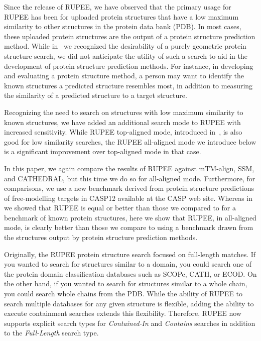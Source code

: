 \documentclass[10pt,letterpaper]{article}
\begin{document}
Since the release of RUPEE, we have observed that the primary usage for RUPEE has been for uploaded protein structures that have a low maximum similarity to other structures in the protein data bank (PDB).
In most cases, these uploaded protein structures are the output of a protein structure prediction method. 
While in~\cite{Ayoub2019} we recognized the desirability of a purely geometric protein structure search, we did not anticipate the utility of such a search to aid in the development of protein structure prediction methods.
For instance, in developing and evaluating a protein structure method, a person may want to identify the known structures a predicted structure resembles most, in addition to measuring the similarity of a predicted structure to a target structure. 

Recognizing the need to search on structures with low maximum similarity to known structures, we have added an additional search mode to RUPEE with increased sensitivity. 
While RUPEE top-aligned mode, introduced in~\cite{Ayoub2019}, is also good for low similarity searches, the RUPEE all-aligned mode we introduce below is a significant improvement over top-aligned mode in that case.  

In this paper, we again compare the results of RUPEE against mTM-align, SSM, and CATHEDRAL, but this time we do so for all-aligned mode.
Furthermore, for comparisons, we use a new benchmark derived from protein structure predictions of free-modelling targets in CASP12 available at the CASP web site. 
Whereas in~\cite{Ayoub2019} we showed that RUPEE is equal or better than those we compared to for a benchmark of known protein structures, here we show that RUPEE, in all-aligned mode, is clearly better than those we compare to using a benchmark drawn from the structures output by protein structure prediction methods. 

Originally, the RUPEE protein structure search focused on full-length matches. 
If you wanted to search for structures similar to a domain, you could search one of the protein domain classification databases such as SCOPe, CATH, or ECOD.
On the other hand, if you wanted to search for structures similar to a whole chain, you could search whole chains from the PDB. 
While the ability of RUPEE to search multiple databases for any given structure is flexible, adding the ability to execute containment searches extends this flexibility.
Therefore, RUPEE now supports explicit search types for \emph{Contained-In} and \emph{Contains} searches in addition to the \emph{Full-Length} search type.
\end{document}
